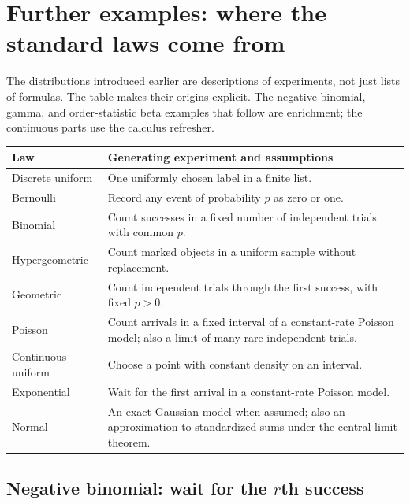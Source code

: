 \section{Further examples: where the standard laws come from}
\label{sec:distribution-provenance}

The distributions introduced earlier are descriptions of experiments,
not just lists of formulas. The table makes their origins explicit.
The negative-binomial, gamma, and order-statistic beta examples that
follow are enrichment; the continuous parts use the calculus refresher.

\begin{center}\small
\begin{tabularx}{\textwidth}{p{}X}
\toprule
Law & Generating experiment and assumptions \\
\midrule
Discrete uniform & One uniformly chosen label in a finite list. \\
Bernoulli & Record any event of probability $p$ as zero or one. \\
Binomial & Count successes in a fixed number of independent trials with common $p$. \\
Hypergeometric & Count marked objects in a uniform sample without replacement. \\
Geometric & Count independent trials through the first success, with fixed $p>0$. \\
Poisson & Count arrivals in a fixed interval of a constant-rate Poisson model; also a limit of many rare independent trials. \\
Continuous uniform & Choose a point with constant density on an interval. \\
Exponential & Wait for the first arrival in a constant-rate Poisson model. \\
Normal & An exact Gaussian model when assumed; also an approximation to standardized sums under the central limit theorem. \\
\bottomrule
\end{tabularx}
\end{center}

\subsection{Negative binomial: wait for the \texorpdfstring{$r$}{r}th success}
\label{sec:negative-binomial}


